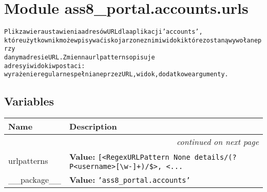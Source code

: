 %
%
%


\section{Module ass8\_portal.accounts.urls}

    \label{ass8_portal:accounts:urls}
\begin{alltt}

Plik zawiera ustawienia adresów URL dla aplikacji 'accounts', 
które użytkownik może wpisywać i skojarzone z nimi widoki które zostaną wywołane przy 
danym adresie URL. Zmienna urlpatterns opisuje 
adresy i widoki w postaci: 
    wyrażenie regularne spełniane przez URL, widok, dodatkowe argumenty.
\end{alltt}



  \subsection{Variables}

    \vspace{-1cm}
\hspace{\varindent}\begin{longtable}{|p{\varnamewidth}|p{\vardescrwidth}|l}
\cline{1-2}
\cline{1-2} \centering \textbf{Name} & \centering \textbf{Description}& \\
\cline{1-2}
\endhead\cline{1-2}\multicolumn{3}{r}{\small\textit{continued on next page}}\\\endfoot\cline{1-2}
\endlastfoot\raggedright u\-r\-l\-p\-a\-t\-t\-e\-r\-n\-s\- & \raggedright \textbf{Value:} 
{\tt \texttt{[}{\textless}RegexURLPattern None details/(?P{\textless}username{\textgreater}[{\textbackslash}w-]+)/\${\textgreater}\texttt{, }{\textless}\texttt{...}}&\\
\cline{1-2}
\raggedright \_\-\_\-p\-a\-c\-k\-a\-g\-e\-\_\-\_\- & \raggedright \textbf{Value:} 
{\tt \texttt{'}\texttt{ass8\_portal.accounts}\texttt{'}}&\\
\cline{1-2}
\end{longtable}

